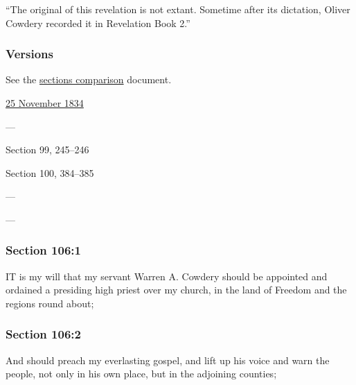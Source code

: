 			``The original of this revelation is not extant. Sometime after its dictation, Oliver Cowdery recorded it in Revelation Book 2.''
						
	\subsubsection{Versions}
		\label{DC106-V}
		
		See the \href{https://drive.google.com/file/d/1goAvNz8jS4R8slYfMG_db55Ty2z_vmgK/view?usp=sharing}{sections comparison} document.
	
		\begin{compactdesc}
			\item[JSP] \hyperref[EMS-1834-JS-25-NOV-1834]{25 November 1834}
			\item[BC] ---
			\item[DC 1835] Section 99, 245--246
			\item[DC 1844] Section 100, 384--385
			\item[TS] ---
			\item[MS] ---
		\end{compactdesc}

	\subsubsection{Section 106:1} %
		\label{DC106-1}

		IT is my will that my servant Warren A. Cowdery should be appointed and ordained a presiding high priest over my church, in the land of Freedom and the regions round about;


	\subsubsection{Section 106:2} %
		\label{DC106-2}

		And should preach my everlasting gospel, and lift up his voice and warn the people, not only in his own place, but in the adjoining counties;

